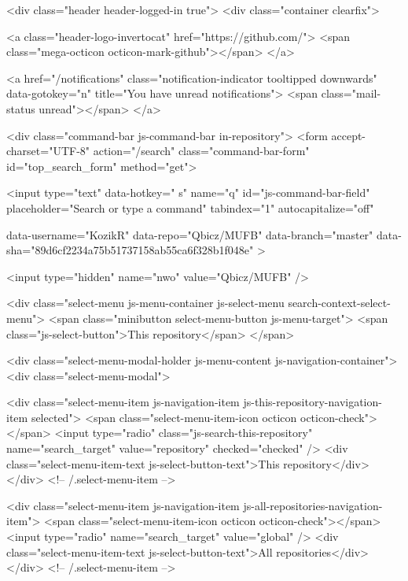       
      
      


      <div class="header header-logged-in true">
  <div class="container clearfix">

    <a class="header-logo-invertocat" href="https://github.com/">
  <span class="mega-octicon octicon-mark-github"></span>
</a>

    
    <a href="/notifications" class="notification-indicator tooltipped downwards" data-gotokey="n" title="You have unread notifications">
        <span class="mail-status unread"></span>
</a>

      <div class="command-bar js-command-bar  in-repository">
          <form accept-charset="UTF-8" action="/search" class="command-bar-form" id="top_search_form" method="get">

<input type="text" data-hotkey=" s" name="q" id="js-command-bar-field" placeholder="Search or type a command" tabindex="1" autocapitalize="off"
    
    data-username="KozikR"
      data-repo="Qbicz/MUFB"
      data-branch="master"
      data-sha="89d6cf2234a75b51737158ab55ca6f328b1f048e"
  >

    <input type="hidden" name="nwo" value="Qbicz/MUFB" />

    <div class="select-menu js-menu-container js-select-menu search-context-select-menu">
      <span class="minibutton select-menu-button js-menu-target">
        <span class="js-select-button">This repository</span>
      </span>

      <div class="select-menu-modal-holder js-menu-content js-navigation-container">
        <div class="select-menu-modal">

          <div class="select-menu-item js-navigation-item js-this-repository-navigation-item selected">
            <span class="select-menu-item-icon octicon octicon-check"></span>
            <input type="radio" class="js-search-this-repository" name="search_target" value="repository" checked="checked" />
            <div class="select-menu-item-text js-select-button-text">This repository</div>
          </div> <!-- /.select-menu-item -->

          <div class="select-menu-item js-navigation-item js-all-repositories-navigation-item">
            <span class="select-menu-item-icon octicon octicon-check"></span>
            <input type="radio" name="search_target" value="global" />
            <div class="select-menu-item-text js-select-button-text">All repositories</div>
          </div> <!-- /.select-menu-item -->

